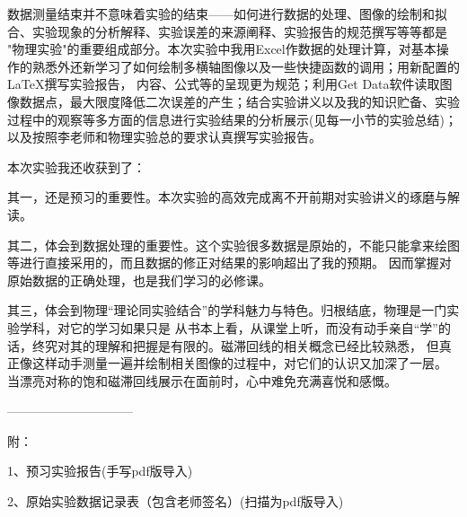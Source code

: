 \documentclass[11pt]{article}
\begin{document}
数据测量结束并不意味着实验的结束——如何进行数据的处理、图像的绘制和拟合、实验现象的分析解释、实验误差的来源阐释、实验报告的规范撰写等等都是
"物理实验"的重要组成部分。本次实验中我用Excel作数据的处理计算，对基本操作的熟悉外还新学习了如何绘制多横轴图像以及一些快捷函数的调用；用新配置的\LaTeX 撰写实验报告，
内容、公式等的呈现更为规范；利用Get Data软件读取图像数据点，最大限度降低二次误差的产生；结合实验讲义以及我的知识贮备、实验过程中的观察等多方面的信息进行实验结果的分析展示(见每一小节的实验总结)；
以及按照李老师和物理实验总的要求认真撰写实验报告。

本次实验我还收获到了：

其一，还是预习的重要性。本次实验的高效完成离不开前期对实验讲义的琢磨与解读。

其二，体会到数据处理的重要性。这个实验很多数据是原始的，不能只能拿来绘图等进行直接采用的，而且数据的修正对结果的影响超出了我的预期。
因而掌握对原始数据的正确处理，也是我们学习的必修课。

其三，体会到物理“理论同实验结合”的学科魅力与特色。归根结底，物理是一门实验学科，对它的学习如果只是
从书本上看，从课堂上听，而没有动手亲自“学”的话，终究对其的理解和把握是有限的。磁滞回线的相关概念已经比较熟悉，
但真正像这样动手测量一遍并绘制相关图像的过程中，对它们的认识又加深了一层。
当漂亮对称的饱和磁滞回线展示在面前时，心中难免充满喜悦和感慨。

——————————

附：

1、预习实验报告(手写pdf版导入)

2、原始实验数据记录表（包含老师签名）(扫描为pdf版导入)

\newpage



\end{document}
